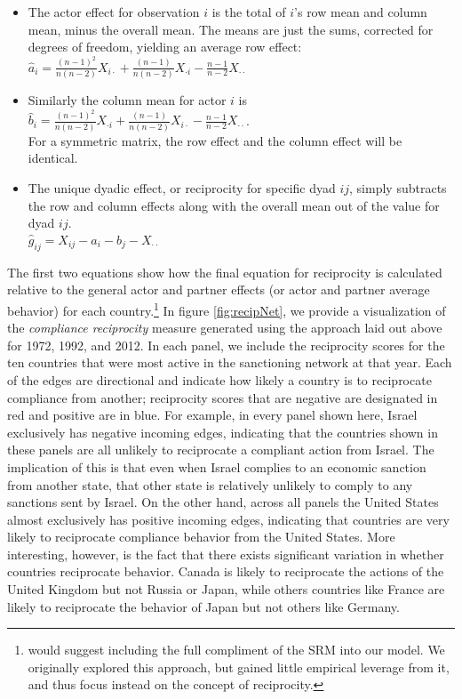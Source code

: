  \begin{itemize}
	 \item The actor effect for observation $i$ is the total of $i$'s row mean and column mean, minus the overall mean.  The means are just the sums, corrected for degrees of freedom, yielding an average row effect:\\
	 $\hat{a}_i = \frac{(n-1)^2}{n(n-2)} X_{i \cdot} + \frac{(n-1)}{n(n-2)} X_{\cdot i} -  \frac{n-1}{n-2} X_{\cdot \cdot} $
	\item Similarly the column mean for actor $i$ is \\
	 $\hat{b}_i = \frac{(n-1)^2}{n(n-2)} X_{\cdot i} + \frac{(n-1)}{n(n-2)} X_{i \cdot } -  \frac{n-1}{n-2} X_{\cdot \cdot} $.\\ For a symmetric matrix, the row effect and the column effect will be identical.
	\item The unique dyadic effect, or reciprocity for specific dyad $ij$, simply subtracts the row and column effects along with the overall mean out of the value for dyad $ij$. \\
	$\hat{g}_{ij} = X_{ij} - \hat{a}_i - \hat{b}_j - X_{\cdot \cdot}$
 \end{itemize}

\doublespacing
The first two equations show how the final equation for reciprocity is calculated relative to the general actor and partner effects (or actor and partner average behavior) for each country.\footnote{\cite{kenny1994interpersonal} would suggest including the full compliment of the SRM into our model. We originally explored this approach, but gained little empirical leverage from it, and thus focus instead on the concept of reciprocity.} In figure \ref{fig:recipNet}, we provide a visualization of the \textit{compliance reciprocity} measure generated using the approach laid out above for 1972, 1992, and 2012. In each panel, we include the reciprocity scores for the ten countries that were most active in the sanctioning network at that year. Each of the edges are directional and indicate how likely a country is to reciprocate compliance from another; reciprocity scores that are negative are designated in red and positive are in blue. For example, in every panel shown here, Israel exclusively has negative incoming edges, indicating that the countries shown in these panels are all unlikely to reciprocate a compliant action from Israel. The implication of this is that even when Israel complies to an economic sanction from another state, that other state is relatively unlikely to comply to any sanctions sent by Israel. On the other hand, across all panels the United States almost exclusively has positive incoming edges, indicating that countries are very likely to reciprocate compliance behavior from the United States.  More interesting, however, is the fact that there exists significant variation in whether countries reciprocate behavior. Canada is likely to reciprocate the actions of the United Kingdom but not Russia or Japan, while others countries like France are likely to reciprocate the behavior of Japan but not others like Germany.

